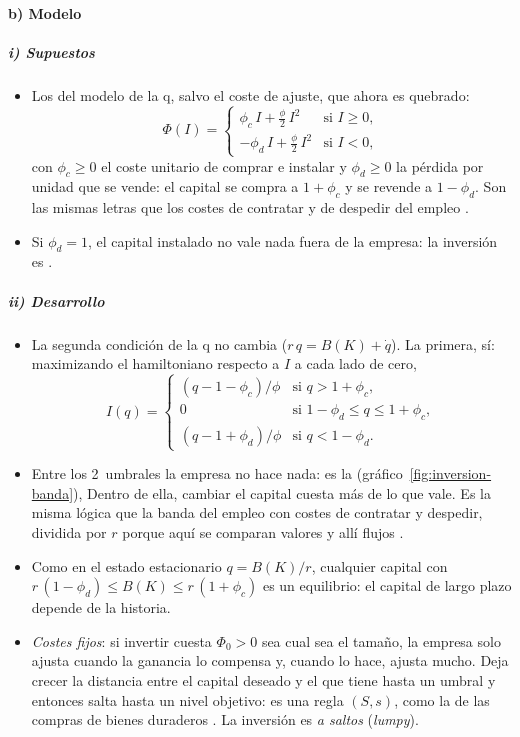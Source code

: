 \documentclass[11pt]{article}
\begin{document}
\paragraph{b) Modelo}

\subparagraph{i) Supuestos}

\begin{itemize}
\item Los del modelo de la q, salvo el coste de ajuste, que ahora es quebrado:
  \begin{equation*}
  \Phi({I})=\begin{cases}\phi_c\,I+\tfrac{\phi}{2}\,I^2 & \text{si } I\geq 0,\\[2pt] -\phi_d\,I+\tfrac{\phi}{2}\,I^2 & \text{si } I<0,\end{cases}
  \end{equation*}
  con $\phi_c\geq 0$ el coste unitario de comprar e instalar y $\phi_d\geq 0$ la pérdida por unidad que se vende: el capital se compra a $1+\phi_c$ y se revende a $1-\phi_d$. Son las mismas letras que los costes de contratar y de despedir del empleo .
\item Si $\phi_d=1$, el capital instalado no vale nada fuera de la empresa: la inversión es .
\end{itemize}

\subparagraph{ii) Desarrollo}

\begin{itemize}
\item La segunda condición de la q no cambia ($r\,q=B(K)+\dot q$). La primera, sí: maximizando el hamiltoniano respecto a $I$ a cada lado de cero,
  \begin{equation*}
  I(q)=\begin{cases}(q-1-\phi_c)/\phi & \text{si } q>1+\phi_c,\\[2pt] 0 & \text{si } 1-\phi_d\leq q\leq 1+\phi_c,\\[2pt] (q-1+\phi_d)/\phi & \text{si } q<1-\phi_d.\end{cases}
  \end{equation*}
\item Entre los 2~umbrales la empresa no hace nada: es la  (gráfico~\ref{fig:inversion-banda}),
  Dentro de ella, cambiar el capital cuesta más de lo que vale. Es la misma lógica que la banda del empleo con costes de contratar y despedir, dividida por $r$ porque aquí se comparan valores y allí flujos .
\item Como en el estado estacionario $q=B(K)/r$, cualquier capital con $r\,(1-\phi_d)\leq B(K)\leq r\,(1+\phi_c)$ es un equilibrio: el capital de largo plazo depende de la historia.
\item \emph{Costes fijos}: si invertir cuesta $\Phi_0>0$ sea cual sea el tamaño, la empresa solo ajusta cuando la ganancia lo compensa y, cuando lo hace, ajusta mucho. Deja crecer la distancia entre el capital deseado y el que tiene hasta un umbral y entonces salta hasta un nivel objetivo: es una regla $(S,s)$, como la de las compras de bienes duraderos . La inversión es \emph{a saltos} (\emph{lumpy}).
\end{itemize}
\end{document}
